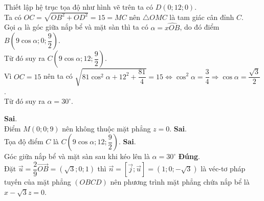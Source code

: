 \begin{ex}
{\begin{center}
	\end{center}
	Thiết lập hệ trục tọa độ như hình vẽ trên ta có $D(0; 12; 0)$.\\
	Ta có $OC=\sqrt{OB^2+OD^2}=15=MC$ nên $\triangle OMC$ là tam giác cân đỉnh $C$.\\
	Gọi $\alpha$ là góc giữa nắp bể và mặt sàn thì ta có $\alpha=\widehat{xOB}$, do đó điểm $B\left(9\cos \alpha; 0;\dfrac{9}{2}\right)$.\\
	Từ đó suy ra $C\left(9\cos \alpha; 12;\dfrac{9}{2}\right)$.\\
	Vì $OC=15$ nên ta có $\sqrt{81\cos^2\alpha+12^2+\dfrac{81}{4}}=15\Leftrightarrow \cos^2\alpha=\dfrac{3}{4}\Rightarrow \cos\alpha=\dfrac{\sqrt{3}}{2}$.\\
	Từ đó suy ra $\alpha=30^\circ$.
	\begin{itemchoice}
		\itemch \textbf{Sai}.\\
		Điểm $M(0; 0; 9)$ nên không thuộc mặt phẳng $z=0$.
		\itemch \textbf{Sai}.\\
		Tọa độ điểm $C$ là $C\left(9\cos \alpha; 12;\dfrac{9}{2}\right)$.
		\itemch \textbf{Sai}.\\
		Góc giữa nắp bể và mặt sàn sau khi kéo lên là $\alpha = 30^\circ$
		\itemch \textbf{Đúng}.\\
		Đặt $\overrightarrow{u}=\dfrac{2}{9}\overrightarrow{OB}=(\sqrt{3}; 0; 1)$ thì $\overrightarrow{n}=\left[\overrightarrow{j}; \overrightarrow{u}\right]=(1; 0; -\sqrt{3})$ là véc-tơ pháp tuyến của mặt phẳng $(OBCD)$ nên phương trình mặt phẳng chứa nắp bể là $x-\sqrt{3}z=0$.
	\end{itemchoice}
	}
\end{ex}

